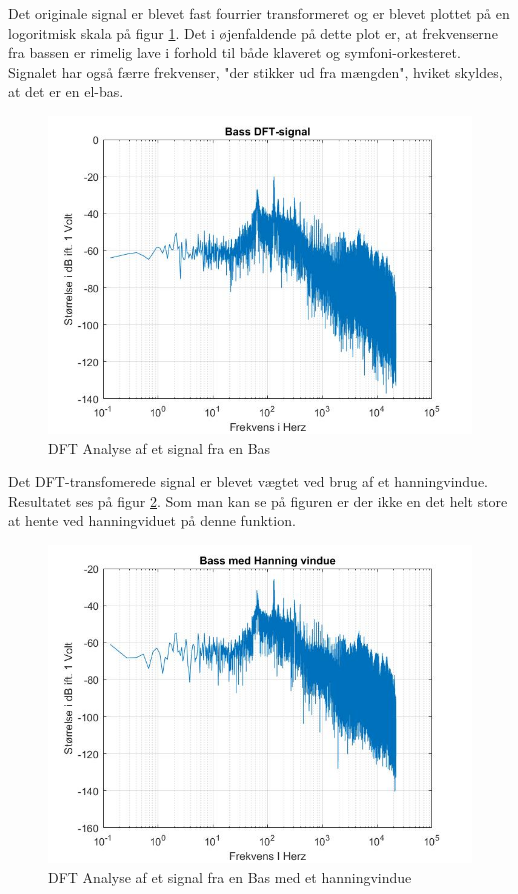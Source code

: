 Det originale signal er blevet fast fourrier transformeret og er blevet plottet på en logoritmisk skala på figur \ref{fig:Bas DFT}. Det i øjenfaldende på dette plot er, at frekvenserne fra bassen er rimelig lave i forhold til både klaveret og symfoni-orkesteret. Signalet har også færre frekvenser, "der stikker ud fra mængden", hviket skyldes, at det er en el-bas.

\begin{figure}[H]
	\centering
	\includegraphics[width=140mm]{figures/Bass/DFT.jpg}
	\caption{DFT Analyse af et signal fra en Bas}
	\label{fig:Bas DFT}
\end{figure}

Det DFT-transfomerede signal er blevet vægtet ved brug af et hanningvindue. Resultatet ses på figur \ref{fig:Bas hanning}. Som man kan se på figuren er der ikke en det helt store at hente ved hanningviduet på denne funktion.
\begin{figure}[H]
	\centering
	\includegraphics[width=140mm]{figures/Bass/hanning.jpg}
	\caption{DFT Analyse af et signal fra en Bas med et hanningvindue}
	\label{fig:Bas hanning}
\end{figure}

